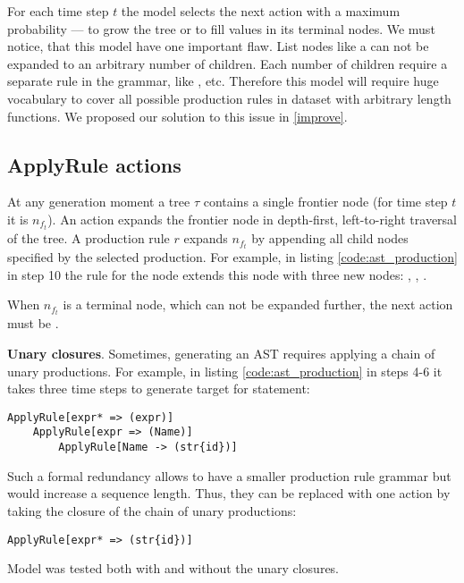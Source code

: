 For each time step $t$ the model selects the next action with a maximum probability ---  to grow the tree or  to fill values in its terminal nodes. We must notice, that this model have one important flaw. List nodes like a  can not be expanded to an arbitrary number of children. Each number of children require a separate rule in the grammar, like ,  etc. Therefore this model will require huge vocabulary to cover all possible production rules in dataset with arbitrary length functions. We proposed our solution to this issue in \cref{improve}.

\subsection{ApplyRule actions}
At any generation moment a tree $\tau$ contains a single frontier node (for time step $t$ it is $n_{f_t}$). An action  expands the frontier node in depth-first, left-to-right traversal of the tree. A production rule $r$ expands $n_{f_t}$ by appending all child nodes specified by the selected production. For example, in listing \ref{code:ast_production} in step 10 the rule for the node  extends this node with three new nodes: , , . 

When $n_{f_t}$ is a terminal node, which can not be expanded further, the next action must be .

\textbf{Unary closures}. Sometimes, generating an AST requires applying a chain of unary productions. For example, in listing \ref{code:ast_production} in steps 4-6 it takes three time steps to generate target for  statement:

\begin{verbatim}
ApplyRule[expr* => (expr)]
    ApplyRule[expr => (Name)]
        ApplyRule[Name -> (str{id})]
\end{verbatim}

Such a formal redundancy allows to have a smaller production rule grammar but would increase a sequence length. Thus, they can be replaced with one action by taking the closure of the chain of unary productions:

\begin{verbatim}
ApplyRule[expr* => (str{id})]
\end{verbatim}

Model was tested both with and without the unary closures.

